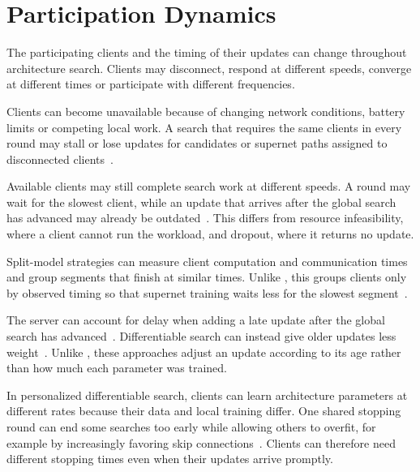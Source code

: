 \section{Participation Dynamics}

The participating clients and the timing of their updates can change throughout architecture search. Clients may disconnect, respond at different speeds, converge at different times or participate with different frequencies.


Clients can become unavailable because of changing network conditions, battery limits or competing local work. A search that requires the same clients in every round may stall or lose updates for candidates or supernet paths assigned to disconnected clients~\cite{optimize_fednas_edge_2021}.

Available clients may still complete search work at different speeds. A round may wait for the slowest client, while an update that arrives after the global search has advanced may already be outdated~\cite{nasfly_2024,rl_fednas_2021,fedregnas_2025}. This differs from resource infeasibility, where a client cannot run the workload, and dropout, where it returns no update.

 Split-model strategies can measure client computation and communication times and group segments that finish at similar times. Unlike , this groups clients only by observed timing so that supernet training waits less for the slowest segment~\cite{nasfly_2024}.

 The server can account for delay when adding a late update after the global search has advanced~\cite{rl_fednas_2021}. Differentiable search can instead give older updates less weight~\cite{fedregnas_2025}. Unlike , these approaches adjust an update according to its age rather than how much each parameter was trained.

In personalized differentiable search, clients can learn architecture parameters at different rates because their data and local training differ. One shared stopping round can end some searches too early while allowing others to overfit, for example by increasingly favoring skip connections~\cite{collaborative_nas_for_pfl_2025}. Clients can therefore need different stopping times even when their updates arrive promptly.

